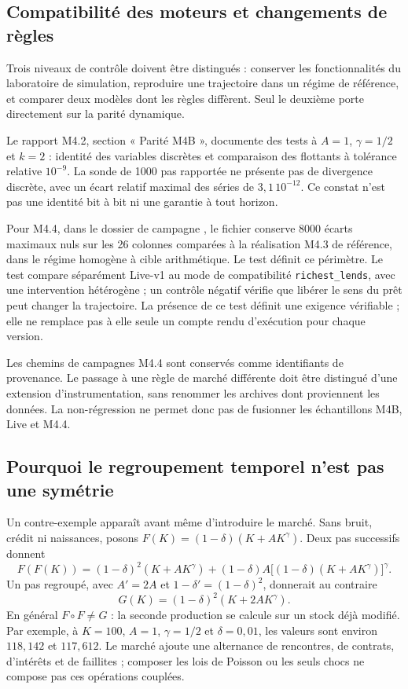 \subsection{Compatibilité des moteurs et changements de règles}
\label{sec:compatibilite}
Trois niveaux de contrôle doivent être distingués : conserver les
fonctionnalités du laboratoire de simulation, reproduire une trajectoire
dans un régime de référence, et comparer deux modèles dont les règles
diffèrent. Seul le deuxième porte directement sur la parité dynamique.

Le rapport M4.2, section « Parité M4B », documente des tests à
$A=1$, $\gamma=1/2$ et $k=2$ : identité des variables discrètes
et comparaison des flottants à tolérance relative $10^{-9}$.
La sonde de 1000 pas rapportée ne présente pas de divergence discrète,
avec un écart relatif maximal des séries de $3{,}1\,10^{-12}$.
Ce constat n'est pas une identité bit à bit ni une garantie à tout horizon.

Pour M4.4, dans le dossier de campagne
, le fichier
conserve 8000 écarts maximaux nuls sur les 26 colonnes comparées à
la réalisation M4.3 de référence, dans le régime homogène à cible
arithmétique. Le test  définit ce
périmètre. Le test  compare
séparément Live-v1 au mode de compatibilité
\texttt{richest\_lends}, avec une intervention hétérogène ; un contrôle
négatif vérifie que libérer le sens du prêt peut changer la trajectoire.
La présence de ce test définit une exigence vérifiable ; elle ne remplace
pas à elle seule un compte rendu d'exécution pour chaque version.

Les chemins de campagnes M4.4 sont conservés comme identifiants de
provenance. Le passage à une règle de marché différente doit être
distingué d'une extension d'instrumentation, sans renommer les archives
dont proviennent les données. La non-régression ne
permet donc pas de fusionner les échantillons M4B, Live et M4.4.

\subsection{Pourquoi le regroupement temporel n'est pas une symétrie}
\label{sec:composition_temps}
Un contre-exemple apparaît avant même d'introduire le marché. Sans bruit,
crédit ni naissances, posons $F(K)=(1-\delta)(K+AK^\gamma)$.
Deux pas successifs donnent
\[
F(F(K))=(1-\delta)^2(K+AK^\gamma)
 +(1-\delta)A\big[(1-\delta)(K+AK^\gamma)\big]^\gamma.
\]
Un pas regroupé, avec $A'=2A$ et
$1-\delta'=(1-\delta)^2$, donnerait au contraire
\[
G(K)=(1-\delta)^2(K+2AK^\gamma).
\]
En général $F\circ F\ne G$ : la seconde production se calcule sur
un stock déjà modifié. Par exemple, à $K=100$, $A=1$,
$\gamma=1/2$ et $\delta=0{,}01$, les valeurs sont environ
$118{,}142$ et $117{,}612$. Le marché ajoute une alternance de
rencontres, de contrats, d'intérêts et de faillites ; composer les lois
de Poisson ou les seuls chocs ne compose pas ces opérations couplées.

